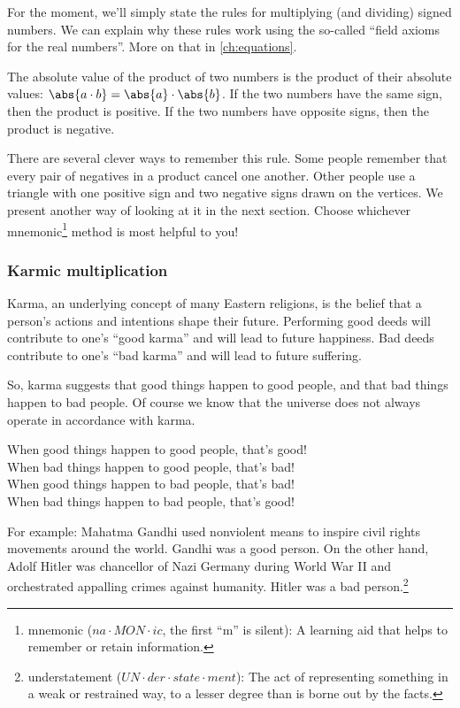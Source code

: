 For the moment, we'll simply state the rules for multiplying (and dividing) signed numbers. We can explain why these rules work using the so-called ``field axioms for the real numbers''. More on that in \cref{ch:equations}.

\begin{boxdef}
The absolute value of the product of two numbers is the product of their absolute values: $\abs{a \cdot b} = \abs{a} \cdot \abs{b}$. If the two numbers have the same sign, then the product is positive. If the two numbers have opposite signs, then the product is negative.
\end{boxdef}

There are several clever ways to remember this rule. Some people remember that every pair of negatives in a product cancel one another. Other people use a triangle with one positive sign and two negative signs drawn on the vertices. We present another way of looking at it in the next section. Choose whichever mnemonic\footnote{mnemonic ($na \cdot MON \cdot ic$, the first ``m'' is silent): A learning aid that helps to remember or retain information.} method is most helpful to you!

\subsubsection{Karmic multiplication}

Karma, an underlying concept of many Eastern religions, is the belief that a person's actions and intentions shape their future. Performing good deeds will contribute to one's ``good karma'' and will lead to future happiness. Bad deeds contribute to one's ``bad karma'' and will lead to future suffering.

So, karma suggests that good things happen to good people, and that bad things happen to bad people. Of course we know that the universe does not always operate in accordance with karma.

\begin{boxdef}
\centering
When good things happen to good people, that's good!
\\
When bad things happen to good people, that's bad!
\\
When good things happen to bad people, that's bad!
\\
When bad things happen to bad people, that's good!
\end{boxdef}

For example: Mahatma Gandhi used nonviolent means to inspire civil rights movements around the world. Gandhi was a good person. On the other hand, Adolf Hitler was chancellor of Nazi Germany during World War II and orchestrated appalling crimes against humanity. Hitler was a bad person.\footnote{understatement ($UN \cdot der \cdot state \cdot ment$): The act of representing something in a weak or restrained way, to a lesser degree than is borne out by the facts.}

